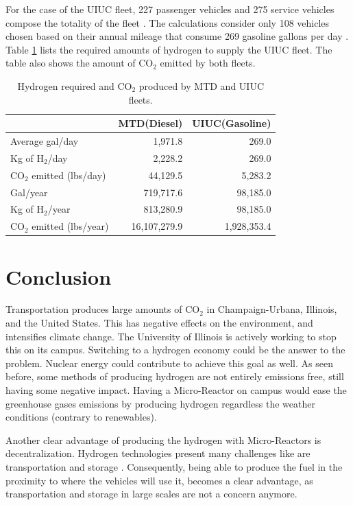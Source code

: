 \documentclass{anstrans}
\begin{document}
For the case of the UIUC fleet, 227 passenger vehicles and 275 service vehicles compose the totality of the fleet \cite{noauthor_increase_2020}. The calculations consider only 108 vehicles chosen based on their annual mileage that consume 269 gasoline gallons per day \cite{holcomb_fueling_2015}. Table \ref{tab:h2req} lists the required amounts of hydrogen to supply the UIUC fleet. The table also shows the amount of CO$_2$ emitted by both fleets.

\begin{table}[]
	\centering
    \caption{Hydrogen required and CO$_2$ produced by MTD and UIUC fleets.}
    \label{tab:h2req}
\begin{tabular}{l|rr}
\hline
                          & MTD(Diesel)     & UIUC(Gasoline)  \\ \hline
Average gal/day           & 1,971.8          & 269.0            \\
Kg of H$_2$/day           & 2,228.2          & 269.0            \\
CO$_2$ emitted (lbs/day)  & 44,129.5         & 5,283.2          \\
Gal/year                  & 719,717.6        & 98,185.0         \\
Kg of H$_2$/year          & 813,280.9        & 98,185.0         \\
CO$_2$ emitted (lbs/year) & 16,107,279.9     & 1,928,353.4      \\ \hline
\end{tabular}
\end{table}

\section{Conclusion}

Transportation produces large amounts of CO$_2$ in Champaign-Urbana, Illinois, and the United States. This has negative effects on the environment, and intensifies climate change. The University of Illinois is actively working to stop this on its campus. Switching to a hydrogen economy could be the answer to the problem. Nuclear energy could contribute to achieve this goal as well. As seen before, some methods of producing hydrogen are not entirely emissions free, still having some negative impact. Having a Micro-Reactor on campus would ease the greenhouse gases emissions by producing hydrogen regardless the weather conditions (contrary to renewables).

Another clear advantage of producing the hydrogen with Micro-Reactors is decentralization. Hydrogen technologies present many challenges like are transportation and storage \cite{office_of_energy_efficiency_and_renewable_energy_hydrogen_2020}. Consequently, being able to produce the fuel in the proximity to where the vehicles will use it, becomes a clear advantage, as transportation and storage in large scales are not a concern anymore.



\end{document}
